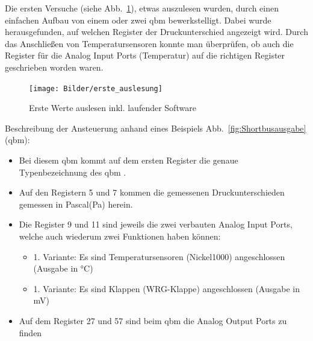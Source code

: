 Die ersten Versuche (siehe  Abb.~\ref{fig:ersteauslesung}), etwas auszulesen wurden, durch einen einfachen Aufbau von einem oder zwei \gls{qbm}  bewerkstelligt. Dabei wurde herausgefunden, auf welchen Register der Druckunterschied angezeigt wird. Durch das Anschließen von Temperatursensoren konnte man überprüfen, ob auch die Register für die Analog Input Ports (Temperatur) auf die richtigen Register geschrieben worden waren.

\begin{figure}[H]
	\centering
	\texttt{[image: Bilder/erste\_auslesung]}
	\caption{Erste Werte auslesen inkl. laufender Software} 
	\label{fig:ersteauslesung}
\end{figure}

Beschreibung der Ansteuerung anhand eines Beispiels Abb.~\ref{fig:Shortbusausgabe} (\gls{qbm}):
\begin{itemize}
	\item Bei diesem \gls{qbm}  kommt auf dem ersten Register die genaue Typenbezeichnung des \gls{qbm} .  
	\item Auf den Registern 5 und 7 kommen die gemessenen Druckunterschieden gemessen in Pascal(Pa) herein. 
	\item Die Register 9 und 11 sind jeweils die zwei verbauten Analog Input Ports, welche auch wiederum zwei Funktionen haben können:
	\begin{itemize}
		\item 1. Variante: Es sind Temperatursensoren (\zB Nickel1000) angeschlossen (Ausgabe in °C)
		\item 1. Variante: Es sind Klappen (\zB WRG-Klappe) angeschlossen (Ausgabe in mV)
	\end{itemize}
	\item Auf dem Register 27 und 57 sind beim \gls{qbm} die Analog Output Ports zu finden
	
	\cite[vgl.][]{siemens:2021}
\end{itemize} 
 